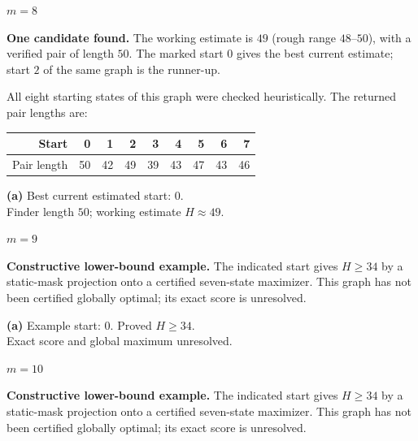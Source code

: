 \documentclass[11pt,a4paper]{article}
\begin{document}
\par\vspace{5mm}
\clearpage
{\LARGE\bfseries $m=8$}\par\vspace{3mm}
\textbf{One candidate found.} The working estimate is $49$ (rough range $48$--$50$), with a verified pair of length $50$. The marked start $0$ gives the best current estimate; start $2$ of the same graph is the runner-up.\par\vspace{2mm}
All eight starting states of this graph were checked heuristically. The returned pair lengths are:\par\smallskip\begin{center}\begin{tabular}{r|rrrrrrrr}Start &0&1&2&3&4&5&6&7\\\hline Pair length &50&42&49&39&43&47&43&46\end{tabular}\end{center}\vspace{2mm}
\begin{minipage}[t]{.94\textwidth}\centering
\resizebox{10.3cm}{!}{}\par
\small\textbf{(a)} Best current estimated start: $0$.\\Finder length $50$; working estimate $H\approx49$.\par\end{minipage}
\clearpage
{\LARGE\bfseries $m=9$}\par\vspace{3mm}
\textbf{Constructive lower-bound example.} The indicated start gives $H\ge34$ by a static-mask projection onto a certified seven-state maximizer. This graph has not been certified globally optimal; its exact score is unresolved.\par\vspace{3mm}
\begin{minipage}[t]{.94\textwidth}\centering
\resizebox{10.3cm}{!}{}\par
\small\textbf{(a)} Example start: $0$. Proved $H\ge34$.\\Exact score and global maximum unresolved.\par\end{minipage}
\clearpage
{\LARGE\bfseries $m=10$}\par\vspace{3mm}
\textbf{Constructive lower-bound example.} The indicated start gives $H\ge34$ by a static-mask projection onto a certified seven-state maximizer. This graph has not been certified globally optimal; its exact score is unresolved.\par\vspace{3mm}
\end{document}
